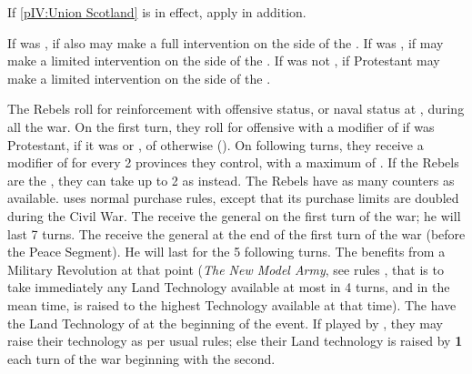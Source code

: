 \aparag If \ref{pIV:Union Scotland} is in effect, apply  in addition.

\phdipl
\aparag If \ENG was \CATHCR, \SPA if also \CATHCR may make a full intervention
on the side of the \royal.
\aparag If \ENG was \PROTANG, \SPA if \CATHCR may make a limited intervention
on the side of the \royal.
\aparag If \ENG was not \CATHCR, \HOL if Protestant may make a limited
intervention on the side of the \parl.

\phadm
\aparag[Reinforcements]
\bparag The Rebels roll for reinforcement with offensive status, or naval
status at , during all the war. On the first turn, they roll for
offensive with a modifier of  if \ENG was Protestant,  if
it was \CATHCR or \PROTANG, of  otherwise (\CATHCO).
\bparag On following turns, they receive a modifier of  for every 2
provinces they control, with a maximum of .
\bparag If the Rebels are the \parl, they can take up to 2 \LD as \ND instead.
\bparag The Rebels have as many counters as \ENG available.
\aparag \ENG uses normal purchase rules, except that its purchase limits are
doubled during the Civil War.
\aparag The \royal receive the general  on the first
turn of the war; he will last 7 turns.%
\aparag The \parl receive the general  at the end of
the first turn of the war (before the Peace Segment).  He will last for the 5
following turns. The \parl benefits from a Military Revolution at that point
(\textit{The New Model Army}, see rules , that is to take immediately any Land Technology available at
most in 4 turns, and in the mean time, is raised to the highest Technology
available at that time).
\aparag The \royal have the Land Technology of \ENG at the beginning of the
event. If played by \ENG, they may raise their technology as per usual rules;
else their Land technology is raised by {\bf 1} each turn of the war beginning
with the second.


